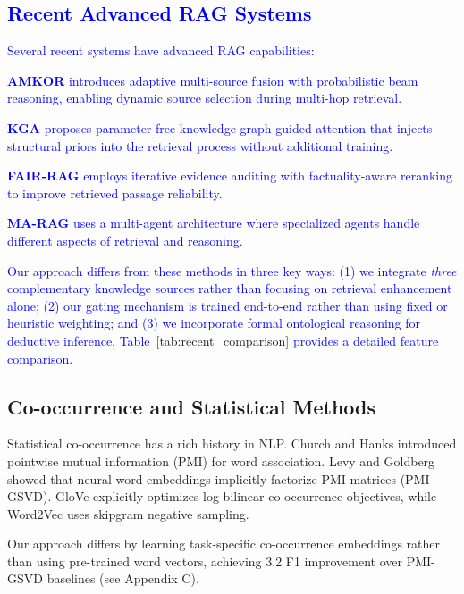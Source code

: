 \documentclass[10pt,twocolumn]{article}
\newcommand{\revision}[1]{\textcolor{blue}{#1}}
\begin{document}
\revision{\subsection{Recent Advanced RAG Systems}
\label{sec:recent_rag}

Several recent systems have advanced RAG capabilities:

\textbf{AMKOR} \cite{fang2024amkor} introduces adaptive multi-source fusion with probabilistic beam reasoning, enabling dynamic source selection during multi-hop retrieval.

\textbf{KGA} \cite{wang2024kga} proposes parameter-free knowledge graph-guided attention that injects structural priors into the retrieval process without additional training.

\textbf{FAIR-RAG} \cite{chen2024fairrag} employs iterative evidence auditing with factuality-aware reranking to improve retrieved passage reliability.

\textbf{MA-RAG} \cite{li2024marag} uses a multi-agent architecture where specialized agents handle different aspects of retrieval and reasoning.

Our approach differs from these methods in three key ways: (1) we integrate \textit{three} complementary knowledge sources rather than focusing on retrieval enhancement alone; (2) our gating mechanism is trained end-to-end rather than using fixed or heuristic weighting; and (3) we incorporate formal ontological reasoning for deductive inference. Table~\ref{tab:recent_comparison} provides a detailed feature comparison.}

\subsection{Co-occurrence and Statistical Methods}
\label{sec:cooccur_related}

Statistical co-occurrence has a rich history in NLP. Church and Hanks \cite{church1990pmi} introduced pointwise mutual information (PMI) for word association. Levy and Goldberg \cite{levy2014neural} showed that neural word embeddings implicitly factorize PMI matrices (PMI-GSVD). GloVe \cite{pennington2014glove} explicitly optimizes log-bilinear co-occurrence objectives, while Word2Vec \cite{mikolov2013word2vec} uses skipgram negative sampling.

Our approach differs by learning task-specific co-occurrence embeddings rather than using pre-trained word vectors, achieving 3.2 F1 improvement over PMI-GSVD baselines (see Appendix C).
\end{document}
